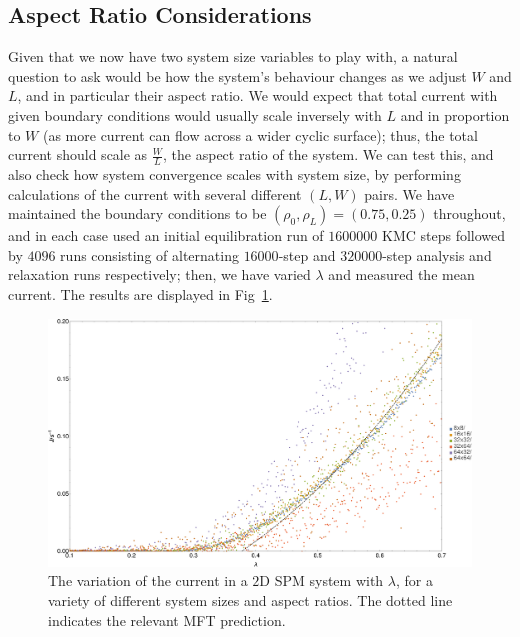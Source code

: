 \subsection{Aspect Ratio Considerations} \label{sec:aspectRatio}
Given that we now have two system size variables to play with, a natural question to ask would be
how the system's behaviour changes as we adjust $W$ and $L$, and in particular their aspect ratio.
We would expect that total current with given boundary conditions would usually scale inversely with
$L$ and in proportion to $W$ (as more current can flow across a wider cyclic surface); thus, the
total current should scale as $\frac{W}{L}$, the aspect ratio of the system. We can test this, and
also check how system convergence scales with system size, by performing calculations of the current
with several different $(L, W)$ pairs. We have maintained the boundary conditions to be 
$(\rho_0, \rho_L) = (0.75, 0.25)$ throughout, and in each case used an initial equilibration run of
$1600000$
KMC steps followed by $4096$ runs consisting of alternating $16000$-step and $320000$-step
analysis and relaxation runs respectively; then, we have varied $\lambda$ and measured the mean
current. The results are displayed in Fig~\ref{fig:aspectRatios}.
\begin{figure} \caption[The variation of the current in a $2$D SPM system with $\lambda$,
for a variety of different system sizes and aspect ratios.]{The variation of the current in a $2$D SPM
system with $\lambda$, for a variety of different system sizes and aspect ratios. The dotted
line indicates the relevant MFT prediction.} 
\label{fig:aspectRatios}
\begin{center}
\includegraphics[width=0.95\textheight, angle=270]{numerics/images/2d/sizeCompLambdaScan}
\end{center}
\end{figure}

